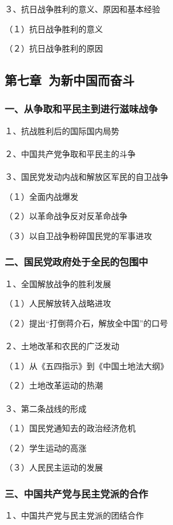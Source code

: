 \documentclass{ctexart}
\begin{document}
３、抗日战争胜利的意义、原因和基本经验

（１）抗日战争胜利的意义

（２）抗日战争胜利的原因



\subsection{第七章\ 为新中国而奋斗}

\subsubsection{一、从争取和平民主到进行滋味战争}

１、抗战胜利后的国际国内局势
\\\\

２、中国共产党争取和平民主的斗争
\\\\

３、国民党发动内战和解放区军民的自卫战争

（１）全面内战爆发

（２）以革命战争反对反革命战争

（３）以自卫战争粉碎国民党的军事进攻

\subsubsection{二、国民党政府处于全民的包围中}

１、全国解放战争的胜利发展　

（１）人民解放转入战略进攻

（２）提出“打倒蒋介石，解放全中国”的口号
\\\\

２、土地改革和农民的广泛发动

（１）从《五四指示》到《中国土地法大纲》

（２）土地改革运动的热潮
\\\\

３、第二条战线的形成

（１）国民党通知去的政治经济危机

（２）学生运动的高涨

（３）人民民主运动的发展

\subsubsection{三、中国共产党与民主党派的合作}
１、中国共产党与民主党派的团结合作
\\\\
\end{document}
